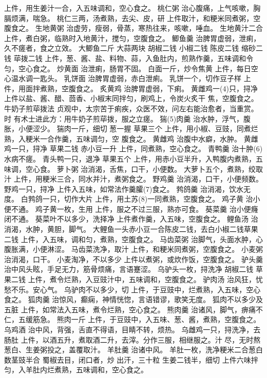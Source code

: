 \documentclass[12pt,UTF8]{ctexbook}
\begin{document}
上件，用生姜汁一合，入五味调和，空心食之。
桃仁粥 治心腹痛，上气咳嗽，胸膈烦满，喘急。
桃仁三两，汤煮熟，去尖、皮，研
上件取汁，和粳米同煮粥，空腹食之。
生地黄粥 治虚劳，瘦弱，骨蒸，寒热往来，咳嗽，唾血。
生地黄汁二合
上件，煮白粥，临熟时入地黄汁，搅匀，空腹食之。
鲫鱼羹 治脾胃虚弱，泄痢，久不瘥者，食之立效。
大鲫鱼二斤 大蒜两块 胡椒二钱 小椒二钱 陈皮二钱 缩砂二
钱 荜拨二钱
上件，葱、酱、盐、料物、蒜，入鱼肚内，煎熟作羹，五味调和令
匀，空心食之。
炒黄面 治泄痢，肠胃不固。
白面一斤，炒令焦黄
上件，每日空心温水调一匙头。
乳饼面 治脾胃虚弱，赤白泄痢。
乳饼一个，切作豆子样
上件，用面拌煮熟，空腹食之。
炙黄鸡 治脾胃虚弱，下痢。
黄雌鸡一(4)只，挦净
上件以盐、酱、醋、茴香、小椒末同拌匀，刷鸡上，令炭火炙干
焦，空腹食之。
牛奶子煎荜拨法
贞观中，太宗苦于痢疾，众医不效，问左右能治愈者，当重赏。时
有术士进此方：用牛奶子煎荜拨，服之立瘥。
猯(5)肉羹 治水肿，浮气，腹胀，小便涩少。
猯肉一斤，细切 葱一握 草果三个
上件，用小椒、豆豉，同煮烂熟，入粳米一合作羹，五味调匀，空
腹食之。
黄雌鸡 治腹中水癖，水肿。
黄雌鸡一只，挦净 草果二钱 赤小豆一升
上件，同煮熟，空心食之。
青鸭羹 治十肿(6)水病不瘥。
青头鸭一只，退净 草果五个
上件，用赤小豆半升，入鸭腹内煮熟，五味调，空心食。
萝卜粥 治消渴，舌焦，口干，小便数。
大萝卜五个，煮熟，绞取汁
上件，用粳米三合，同水并汁，煮粥食之。
野鸡羹 治消渴，口干，小便频数。
野鸡一只，挦净
上件入五味，如常法作羹臛(7)食之。
鹁鸽羹 治消渴，饮水无度。
白鹁鸽一只，切作大片
上件，用土苏(8)一同煮熟，空腹食之。
鸡子黄 治小便不通。
鸡子黄一枚，生用
上件，服之不过三服，熟亦可食。
葵菜羹 治小便癃闭不通。
葵菜叶不以多少，洗择净
上件煮作羹，入五味，空腹食之。
鲤鱼汤 治消渴，水肿，黄胆，脚气。
大鲤鱼一头赤小豆一合陈皮二钱，去白小椒二钱草果二钱
上件，入五味，调和匀，煮熟，空腹食之。
马齿菜粥 治脚气，头面水肿，心腹胀满，小便淋涩。
马齿菜洗净，取汁
上件，和粳米同煮粥，空腹食之。
小麦粥 治消渴，口干。
小麦淘净，不以多少
上件以煮粥，或炊作饭，空腹食之。
驴头羹 治中风头眩，手足无力，筋骨烦痛，言语蹇涩。
乌驴头一枚，挦洗净 胡椒二钱 草果二钱
上件，煮令烂熟，入豆豉汁中，五味调和，空腹食之。
驴肉汤 治风狂，忧愁不乐。安心气。
乌驴肉不以多少，切
上件，于豆豉中，烂煮熟，入五味，空心食之。
狐肉羹 治惊风，癫痫，神情恍惚，言语错谬，歌笑无度。
狐肉不以多少及五脏
上件，如常法入五味，煮令烂熟，空心食之。
熊肉羹 治诸风，脚气，痹痛不仁，五缓筋急。
熊肉一斤
上件，于豆豉中，入五味、葱、酱，煮熟，空腹食之。
乌鸡酒 治中风，背强，舌直不得语，目睛不转，烦热。
乌雌鸡一只，挦洗净，去肠肚
上件，以酒五升，煮取酒二升，去滓。分作三服，相继服之。汁
尽，无时熬葱白、生姜粥投之，盖覆取汁。
羊肚羹 治诸中风。
羊肚一枚，洗净粳米二合葱白数茎豉半合 蜀椒去目，闭口者，炒
出汗，三十粒 生姜二钱半，细切
上件六味拌匀，入羊肚内烂煮熟，五味调和，空心食之。
\end{document}
